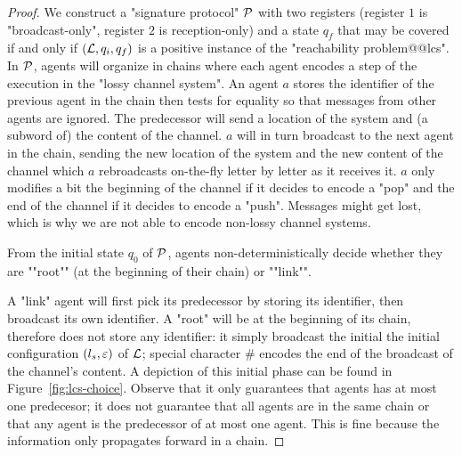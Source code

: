 \begin{proof}
	We construct a "signature protocol" $\mathcal{P}$ with two registers (register $1$ is "broadcast-only", register $2$ is reception-only) and a state $q_f$ that may be covered if and only if $(\mathcal{L}, q_i, q_f)$ is a positive instance of the "reachability problem@@lcs". In $\mathcal{P}$, agents will organize in chains where each agent encodes a step of the execution in the "lossy channel system". An agent $a$ stores the identifier of the previous agent in the chain then tests for equality so that messages from other agents are ignored. The predecessor will send a location of the system and (a subword of) the content of the channel. $a$ will in turn broadcast to the next agent in the chain, sending the new location of the system and the new content of the channel which $a$ rebroadcasts on-the-fly letter by letter as it receives it. $a$ only modifies a bit the beginning of the channel if it decides to encode a "pop" and the end of the channel if it decides to encode a "push". Messages might get lost, which is why we are not able to encode non-lossy channel systems.
	
	\AP From the initial state $q_0$ of $\mathcal{P}$, agents non-deterministically decide whether they are ""root"" (at the beginning of their chain) or ""link"". 
	
	A "link" agent will first pick its predecessor by storing its identifier, then broadcast its own identifier.
	A "root" will be at the beginning of its chain, therefore does not store any identifier: it simply broadcast the initial the initial configuration $(l_s,\varepsilon)$ of $\mathcal{L}$; special character $\#$ encodes the end of the broadcast of the channel's content.  A depiction of this initial phase can be found in Figure~\ref{fig:lcs-choice}.  
	Observe that it only guarantees that agents has at most one predecesor; it does not guarantee that all agents are in the same chain or that any agent is the predecessor of at most one agent. This is fine because the information only propagates forward in a chain. 


\end{proof}
